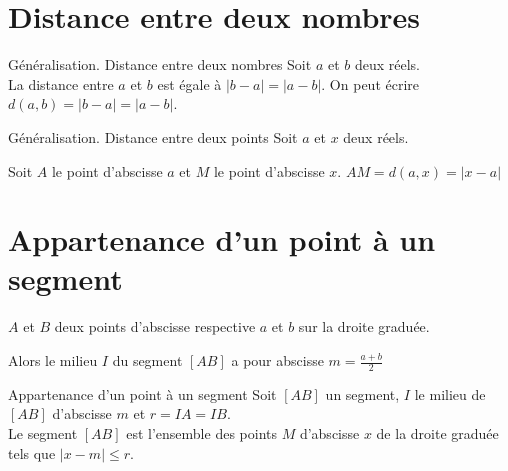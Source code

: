 \begin{pageCours}
\begin{Ex}
\end{Ex}



\section{Distance entre deux nombres}

\begin{DefT}{Généralisation. Distance entre deux nombres}
Soit $a$ et $b$ deux réels.\\
La distance entre $a$ et $b$ est égale à $\vert b-a\vert=\vert a-b\vert$. On peut écrire $d(a,b)=\vert b-a\vert=\vert a-b\vert$.
\end{DefT}

\begin{DefT}{Généralisation. Distance entre deux points}
Soit $a$ et $x$ deux réels.

Soit $A$ le point d'abscisse $a$ et $M$ le point d'abscisse $x$. $AM = d(a,x) = \vert x-a\vert$
\end{DefT}

 

\section{Appartenance d'un point à un segment}

\begin{Th}
$A$ et $B$ deux points d'abscisse respective $a$ et $b$ sur la droite graduée. 

Alors le milieu $I$ du segment $[AB]$ a pour abscisse $m=\frac{a+b}{2}$
\end{Th}

\begin{ThT}{Appartenance d'un point à un segment}
Soit $[AB]$ un segment, $I$ le milieu de $[AB]$ d'abscisse $m$ et $r = IA = IB$.\\
Le segment $[AB]$ est l'ensemble des points $M$ d'abscisse $x$ de la droite graduée tels que $\vert x- m \vert \leq r$.
\end{ThT}
 
\end{pageCours}


